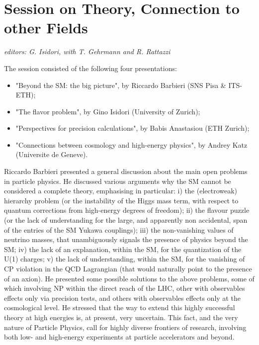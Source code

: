 \section{Session on Theory, Connection to other Fields}\label{theory}{\it editors: G. Isidori, with T. Gehrmann and R. Rattazzi}

\noindent The session consisted of the following four presentations: 
\begin{itemize} \setlength{\itemsep}{-1ex}
\item "Beyond the SM: the big picture",  by  Riccardo Barbieri (SNS Pisa \& ITS-ETH); 
\item "The flavor problem", by Gino Isidori (University of Zurich); 
\item "Perspectives for precision calculations", by Babis Anastasiou (ETH Zurich); 
\item  "Connections between cosmology and high-energy physics", by Andrey Katz (Universite de Geneve).
\end{itemize}

\noindent Riccardo Barbieri presented a general discussion about the main open problems in particle physics.
He  discussed various arguments why the SM cannot be considered a complete theory,
emphasising in particular:  i) the (electroweak) hierarchy problem (or the instability of the Higgs mass term,
with respect to quantum corrections from high-energy degrees of freedom); 
ii) the flavour puzzle (or the lack of understanding for the large, 
and apparently non accidental,  span of the entries of the SM Yukawa couplings); 
iii) the non-vanishing values of neutrino masses, that unambiguously 
signals the presence of physics beyond the SM;
iv)  the lack  of an explanation, within the SM, for the quantization of the U(1) charges; 
v) the lack of understanding, within the SM, for the vanishing of CP 
violation in the QCD Lagrangian (that would naturally point to the presence of an axion).
He presented some possible solutions to the above problems, some of which involving 
NP within the direct reach of the LHC, other with observables effects only via precision
tests, and others with observables effects only at the cosmological level. 
He stressed  that the way to extend this highly successful theory 
at high energies is, at present, very uncertain.  This fact, and the very nature of Particle Physics,
call for highly diverse frontiers of research, involving both low- and high-energy experiments
at particle accelerators and beyond.
\medskip

